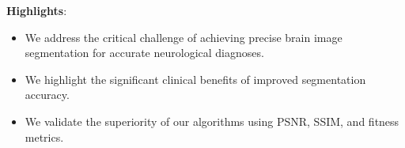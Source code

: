 \documentclass[11pt]{article}
\begin{document}
\textbf{Highlights}:\\

\begin{itemize}
    \item We address the critical challenge of achieving precise brain image segmentation for accurate neurological diagnoses.
    \item We highlight the significant clinical benefits of improved segmentation accuracy.
    \item We validate the superiority of our algorithms using PSNR, SSIM, and fitness metrics.
\end{itemize}
\end{document}
